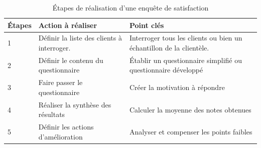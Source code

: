             \begin{longtable}{p{2cm} p{5cm} p{6cm}}
                \caption{Étapes de réalisation d’une enquête de satisfaction}
                \label{table:etapeDeRealistaionEnqSatisfat}
                \\\hline\hline
                    \textbf{Étapes} & \textbf{Action à réaliser} & \textbf{Point cl{\'e}s}
                \\\hline\hline
                    1 & Définir la liste des clients à interroger.
                    & Interroger tous les clients ou bien un échantillon de la clientèle.
                    \\
                    2 & Définir le contenu du questionnaire & Établir
                    un questionnaire simplifié ou questionnaire développé
                    \\
                    3 & Faire passer le questionnaire & Créer la motivation à répondre
                    \\
                    4 & Réaliser la synthèse des résultats & Calculer la moyenne des notes
                    obtenues
                    \\
                    5 & Définir les actions d’amélioration & Analyser et compenser les points
                    faibles 
                \\\bottomrule
            \end{longtable}
